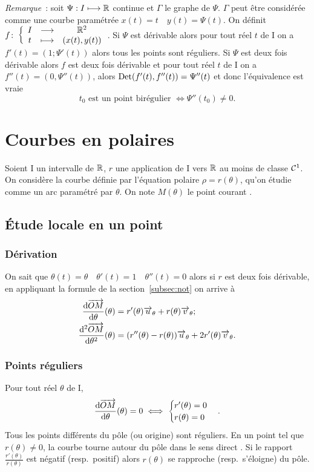 \emph{Remarque}~:
soit \(\Psi : I \longmapsto \mathbb{R}\) continue et \(\Gamma\) le graphe de \(\Psi\). 
\(\Gamma\) peut être considérée comme une courbe paramétrée \(x(t)=t \quad 
y(t)=\Psi(t)\). On définit \(f\colon \left\{\begin{array}{ccc} I & \longrightarrow &\mathbb{R}^2\\ t & \longmapsto & (x(t),y(t)) \end{array} \right.\). Si 
\(\Psi\) est dérivable alors pour tout réel \(t\) de I on a 
\(f'(t)=(1;\Psi'(t))\) alors tous les points sont réguliers. Si \(\Psi\) est 
deux fois dérivable alors \(f\) est deux fois dérivable et pour tout réel \(t\) 
de I on a \(f''(t)=(0, \Psi''(t))\), alors \(\operatorname{Det}(f'(t),f''(t))=\Psi''(t)\) et 
donc l'équivalence est vraie
\begin{equation}
  t_0 \text{~est un point birégulier } \iff \Psi''(t_0) \neq 0.
\end{equation}

\section{Courbes en polaires}
Soient I un intervalle de \(\mathbb{R}\), \(r\) une application de I vers \(\mathbb{R}\) au 
moins de classe \(\mathcal{C}^{1}\). On considère la courbe définie par l'équation 
polaire \(\rho = r(\theta)\), qu'on étudie comme un arc paramétré par 
\(\theta\). On note \(M(\theta)\) le point \og courant \fg{}.

\subsection{Étude locale en un point}
\subsubsection{Dérivation}
On sait que \(\theta(t)=\theta \quad \theta'(t)=1 \quad \theta''(t)=0\) alors si 
\(r\) est deux fois dérivable, en appliquant la formule de la 
section~\ref{subsec:not} on arrive à
\begin{align}
  \dfrac{\mathrm{d} \overrightarrow{OM}}{\mathrm{d} \theta}(\theta)&=r'(\theta) \overrightarrow{u}_\theta + r(\theta) 
  \overrightarrow{v}_\theta;\\
  \dfrac{\mathrm{d}^2 \overrightarrow{OM}}{\mathrm{d} {\theta}^2}(\theta)&=(r''(\theta)-r(\theta)) \overrightarrow{u}_\theta + 
  2r'(\theta) \overrightarrow{v}_\theta.
\end{align}

\subsubsection{Points réguliers}
Pour tout réel \(\theta\) de I,
\begin{equation}
  \dfrac{\mathrm{d} \overrightarrow{OM}}{\mathrm{d} \theta}(\theta)=0 \iff
  \begin{cases}
    r'(\theta) = 0 \\ r(\theta)=0
  \end{cases}.
\end{equation}
Tous les points différents du pôle (ou origine) sont réguliers. En un point tel 
que \(r(\theta) \neq 0\), la courbe \og tourne autour du pôle dans le sens 
direct \fg{}. Si le rapport \(\frac{r'(\theta)}{r(\theta)}\) est négatif (resp.\ 
positif) alors \(r(\theta)\) se rapproche (resp.\ s'éloigne) du pôle.

